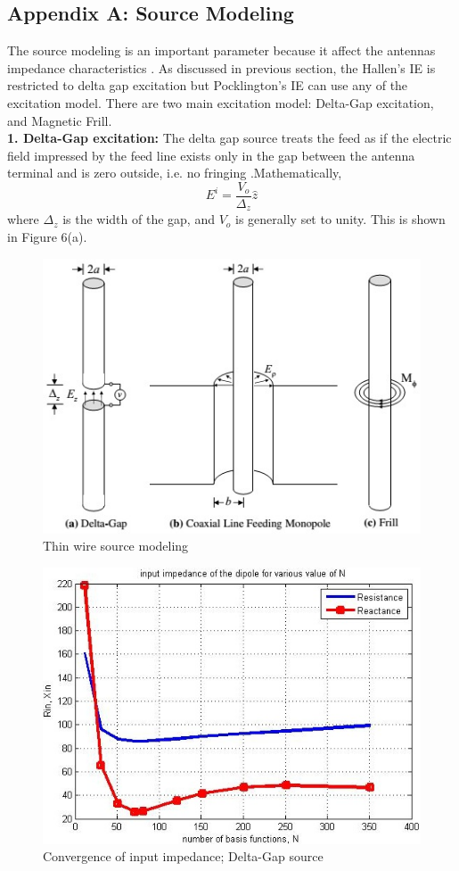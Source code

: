\documentclass[aps,prstab,twocolumn,superscriptaddress,groupedaddress,showkeys,nofootinbib]{revtex4}  %
\begin{document}
\subsection*{Appendix A:  Source Modeling}
The source modeling is an important parameter because it affect the antennas impedance characteristics \cite{gibb}.  As discussed in previous section, the Hallen's IE is restricted to delta gap excitation but Pocklington's IE can use any of the excitation model. There are two main excitation model: Delta-Gap excitation, and Magnetic Frill.\\
\textbf{1. Delta-Gap excitation:} The delta gap source treats the feed as if the electric field impressed by the feed line exists only in the gap between the antenna terminal and is zero outside, i.e. no fringing \cite{gibb}.Mathematically, 
\begin{equation}
E^i=\frac{V_o}{\Delta_z} \hat{z}
\end{equation}
where $ \Delta_z $ is the width of the gap, and $ V_o $ is generally set to unity. This is shown in Figure 6(a).\\
\begin{figure}[here!]
\centering
\includegraphics[scale=0.5]{source.jpg}
\caption{Thin wire source modeling \cite{gibb}}
\end{figure}
\begin{figure}[here!]
\centering
\includegraphics[scale=0.5]{delta.jpg}
\caption{Convergence of input impedance; Delta-Gap source}
\end{figure}
\end{document}
